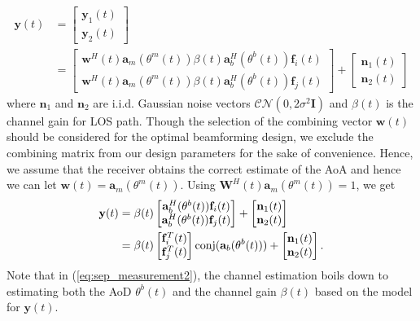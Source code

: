 \documentclass[conference]{IEEEtran}
\begin{document}
\begin{align}
\mathbf{y}(t) &= \begin{bmatrix}\mathbf{y}_{1}(t) \\ \mathbf{y}_{2}(t) \end{bmatrix} \nonumber \\
 &= \begin{bmatrix}\mathbf{w}^{H}(t)\mathbf{a}_{m}(\theta^{m}(t))\beta(t) \mathbf{a}^{H}_{b}(\theta^{b}(t))\mathbf{f}_{i}(t) \\
\mathbf{w}^{H}(t)\mathbf{a}_{m}(\theta^{m}(t))\beta(t) \mathbf{a}^{H}_{b}(\theta^{b}(t))\mathbf{f}_{j}(t)  \end{bmatrix} + \begin{bmatrix}\mathbf{n}_{1}(t) \\ \mathbf{n}_{2}(t) \end{bmatrix}
\end{align}
where $\mathbf{n}_{1}$ and $\mathbf{n}_{2}$ are i.i.d. Gaussian noise vectors $\mathcal{CN}(0,2\sigma^{2}\mathbf{I})$ and $\beta(t)$ is the channel gain for LOS path.
Though the selection of the combining vector $\mathbf{w}(t)$ should be considered for the optimal beamforming design, we exclude  the combining matrix from our design parameters for the sake of convenience.
Hence, we assume that the receiver obtains the correct estimate of the AoA and hence we can let $\mathbf{w}(t) =\mathbf{a}_{m}(\theta^{m}(t))$.
Using $\mathbf{W}^{H}(t)\mathbf{a}_{m}(\theta^{m}(t))=1$, we get
\begin{align}
\mathbf{y}(t) &= \beta(t) \begin{bmatrix} \mathbf{a}^{H}_{b}(\theta^{b}(t))\mathbf{f}_{i}(t) \\
 \mathbf{a}^{H}_{b}(\theta^{b}(t))\mathbf{f}_{j}(t)  \end{bmatrix} + \begin{bmatrix}\mathbf{n}_{1}(t) \\ \mathbf{n}_{2}(t) \end{bmatrix} \label{eq:sep_measurement1}
  \\
  &= \beta(t)  \begin{bmatrix}\mathbf{f}_{i}^{T}(t) \\
\mathbf{f}_{j}^{T}(t)  \end{bmatrix} {\rm conj}( \mathbf{a}_{b}(\theta^{b}(t)))+ \begin{bmatrix}\mathbf{n}_{1}(t) \\ \mathbf{n}_{2}(t) \end{bmatrix}. \label{eq:sep_measurement2}
 \end{align}
Note that in (\ref{eq:sep_measurement2}), the channel estimation boils down to estimating both the AoD $\theta^{b}(t)$ and the channel gain $\beta(t)$ based on the model for $\mathbf{y}(t)$.
\end{document}

